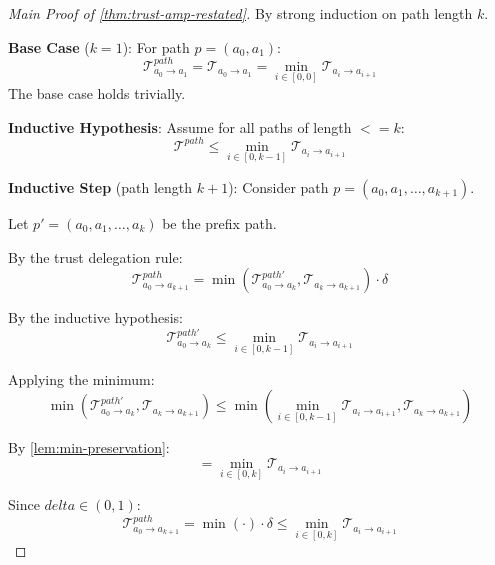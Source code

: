 \documentclass[
]{article}
\begin{document}
\begin{proof}[Main Proof of \cref{thm:trust-amp-restated}]
By strong induction on path length $k$.

\textbf{Base Case} ($k = 1$): For path $p = (a_0, a_1)$:
\begin{equation}
\label{eq:62-base}
\mathcal{T}_{a_0 \to a_1}^{path} = \mathcal{T}_{a_0 \to a_1} = \min_{i \in [0,0]} \mathcal{T}_{a_i \to a_{i+1}}
\end{equation}
The base case holds trivially.

\textbf{Inductive Hypothesis}: Assume for all paths of length $<= k$:
\begin{equation}
\label{eq:62-ind-hyp}
\mathcal{T}^{path} \leq \min_{i \in [0,k-1]} \mathcal{T}_{a_i \to a_{i+1}}
\end{equation}

\textbf{Inductive Step} (path length $k + 1$): Consider path $p = (a_0, a_1, \ldots, a_{k+1})$.

Let $p' = (a_0, a_1, \ldots, a_k)$ be the prefix path.

By the trust delegation rule:
\begin{equation}
\label{eq:62-step-1}
\mathcal{T}_{a_0 \to a_{k+1}}^{path} = \min(\mathcal{T}_{a_0 \to a_k}^{path'}, \mathcal{T}_{a_k \to a_{k+1}}) \cdot \delta
\end{equation}

By the inductive hypothesis:
\begin{equation}
\label{eq:62-step-2}
\mathcal{T}_{a_0 \to a_k}^{path'} \leq \min_{i \in [0,k-1]} \mathcal{T}_{a_i \to a_{i+1}}
\end{equation}

Applying the minimum:
\begin{equation}
\label{eq:62-step-3}
\min(\mathcal{T}_{a_0 \to a_k}^{path'}, \mathcal{T}_{a_k \to a_{k+1}}) \leq \min\left(\min_{i \in [0,k-1]} \mathcal{T}_{a_i \to a_{i+1}}, \mathcal{T}_{a_k \to a_{k+1}}\right)
\end{equation}

By \cref{lem:min-preservation}:
\begin{equation}
\label{eq:62-step-4}
= \min_{i \in [0,k]} \mathcal{T}_{a_i \to a_{i+1}}
\end{equation}

Since $delta \in (0,1)$:
\begin{equation}
\label{eq:62-step-5}
\mathcal{T}_{a_0 \to a_{k+1}}^{path} = \min(\cdot) \cdot \delta \leq \min_{i \in [0,k]} \mathcal{T}_{a_i \to a_{i+1}}
\end{equation}
\end{proof}
\end{document}

